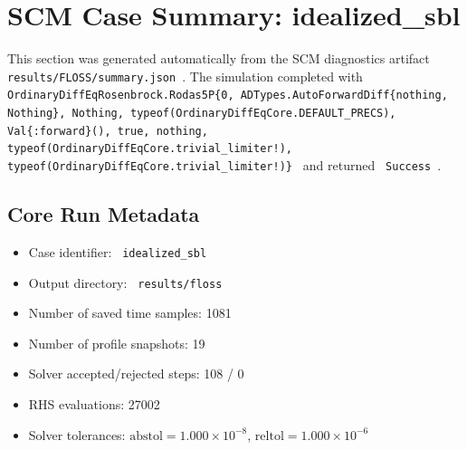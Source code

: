 \section{SCM Case Summary: idealized\_sbl}
\label{sec:scm_case_floss_floss_80x2m_9h_report}

This section was generated automatically from the SCM diagnostics artifact
\texttt{ results/FLOSS/summary.json }. The simulation completed with \texttt{ OrdinaryDiffEqRosenbrock.Rodas5P\{0, ADTypes.AutoForwardDiff\{nothing, Nothing\}, Nothing, typeof(OrdinaryDiffEqCore.DEFAULT\_PRECS), Val\{:forward\}(), true, nothing, typeof(OrdinaryDiffEqCore.trivial\_limiter!), typeof(OrdinaryDiffEqCore.trivial\_limiter!)\} }
and returned \texttt{ Success }.

\subsection{Core Run Metadata}
\begin{itemize}
  \item Case identifier: \texttt{ idealized\_sbl }
  \item Output directory: \texttt{ results/floss }
  \item Number of saved time samples: 1081
  \item Number of profile snapshots: 19
  \item Solver accepted/rejected steps: 108 / 0
  \item RHS evaluations: 27002
  \item Solver tolerances: $\mathrm{abstol}=1.000 \times 10^{-8}$, $\mathrm{reltol}=1.000 \times 10^{-6}$
\end{itemize}

